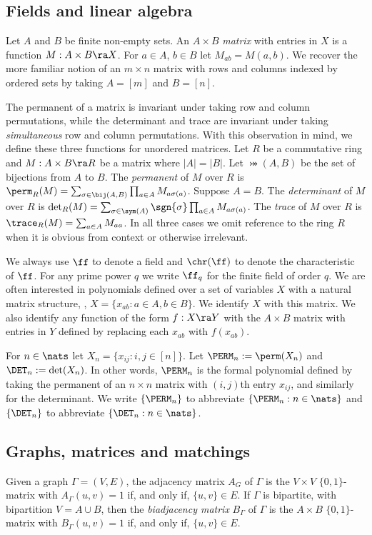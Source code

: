 \documentclass{toc}
\begin{document}
\subsection{Fields and linear algebra}

Let $A$ and $B$ be finite non-empty sets. An $A\times B$ \emph{matrix}
with entries in $X$ is a function $M : A \times B \ra X$. For $a \in A$, $b \in
B$ let $M_{ab} = M(a, b)$. We recover the more familiar notion of an $m \times
n$ matrix with rows and columns indexed by ordered sets by taking $A = [m]$ and
$B = [n]$.

The permanent of a matrix is invariant under taking row and column permutations,
while the determinant and trace are invariant under taking \emph{simultaneous}
row and column permutations.  With this observation in mind, we define these
three functions for unordered matrices.  Let $R$ be a commutative ring and $M : A
\times B \ra R$ be a matrix where $ \vert A \vert = \vert B \vert$. Let $\bij(A,
B)$ be the set of bijections from $A$ to $B$. The \emph{permanent} of $M$ over
$R$ is $\perm_R(M) = \sum_{\sigma \in \bij(A, B)}\prod_{a \in A} M_{a
  \sigma(a)}$.  Suppose $A = B$.  The \emph{determinant} of $M$ over $R$ is
$\det_R (M) = \sum_{\sigma \in \sym(A)}\sgn{\sigma}\prod_{a \in A} M_{a
  \sigma(a)}$.  The \emph{trace} of $M$ over $R$ is $\trace_R(M) = \sum_{a \in A}
M_{a a}$.  In all three cases we omit reference to the ring $R$ when it is
obvious from context or otherwise irrelevant.

We always use $\ff$ to denote a field and $\chr(\ff)$ to denote the
characteristic of $\ff$.  For any prime power $q$ we write $\ff_q$ for the
finite field of order $q$.  We are often interested in polynomials defined over a
set of variables $X$ with a natural matrix structure, \ie, $X = \{x_{ab} : a
\in A, b \in B\}$.  We identify $X$ with this matrix.  We also identify any
function of the form $f : X \ra Y$ with the $A \times B$ matrix with entries in
$Y$ defined by replacing each $x_{ab}$ with $f(x_{ab})$.

For $n \in \nats$ let $X_n = \{x_{ij} : i, j \in [n]\}$.  Let $\PERM_n :=
\perm(X_n)$ and $\DET_n := \det(X_n)$.  In other words, $\PERM_n$
is the formal polynomial defined by taking the permanent
of an $n \times n$ matrix with $(i, j)$th entry $x_{i j}$, and
similarly for the determinant.
We write $\{\PERM_n\}$ to abbreviate $\{\PERM_n : n \in \nats\}$ and $\{\DET_n\}$
to abbreviate $\{\DET_n : n \in \nats\}$.

\subsection{Graphs, matrices and matchings}
Given a graph $\Gamma = (V,E)$, the adjacency matrix $A_G$ of $\Gamma$ is the $V \times V$ $\{0,1\}$-matrix with $A_\Gamma(u,v) = 1$ if, and only if, $\{u,v\} \in E$.  If $\Gamma$ is bipartite, with bipartition $V = A \cup B$, then the \emph{biadjacency matrix} $B_\Gamma$ of $\Gamma$ is the $A \times B$ $\{0,1\}$-matrix with $B_\Gamma(u,v) = 1$ if, and only if, $\{u,v\} \in E$.
\end{document}
